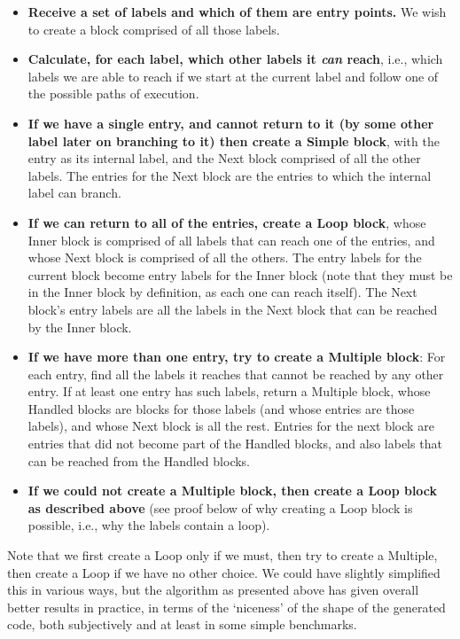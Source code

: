\documentclass[preprint,10pt]{sigplanconf}
\begin{document}
\begin{itemize}
\item \textbf{Receive a set of labels and which of them are entry points.}
      We wish to create a block comprised of all those labels.
\item \textbf{Calculate, for each label, which other labels it \emph{can}
      reach}, i.e., which labels we are able to reach if we start
      at the current label and follow one of the possible paths
      of execution.
\item \textbf{If we have a single entry, and cannot return to it (by some other
      label later on branching to it) then create a Simple block}, with the entry
      as its internal label, and the Next block comprised of all
      the other labels. The entries for the Next block are the entries
      to which the internal label can branch.
\item \textbf{If we can return to all of the entries, create a
      Loop block}, whose Inner block is comprised of all labels that
      can reach one of the entries, and whose Next block is
      comprised of all the others. The entry labels for the current
      block become entry labels for the Inner block (note that
      they must be in the Inner block by definition, as each one can reach
      itself). The Next block's entry labels are all the labels
      in the Next block that can be reached by the Inner block.
\item \textbf{If we have more than one entry, try to create a Multiple block}: For each entry, find all
      the labels it reaches that cannot be reached by any other
      entry. If at least one entry has such labels, return a
      Multiple block, whose Handled blocks are blocks for those
      labels (and whose entries are those labels), and whose Next block is all the rest.
      Entries for the next block are entries that did not become part of the Handled
      blocks, and also labels that can be reached from the Handled blocks.
\item \textbf{If we could not create a Multiple block, then create a Loop block as described above}
      (see proof below of why creating a Loop block is possible, i.e., why the labels contain a loop).
\end{itemize}
Note that we first create a Loop only if we must, then try to create a
Multiple, then create a Loop if we have no other choice. We could have slightly simplified this in
various ways, but the algorithm as presented above has given overall better
results in practice, in terms of the `niceness' of the shape of the
generated code, both subjectively and at least in some simple benchmarks.
\end{document}
